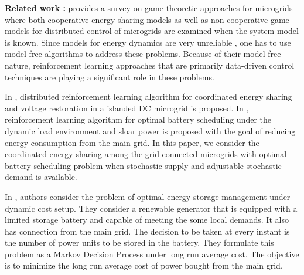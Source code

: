 \textbf{Related work :} \cite{saad2012game} provides a survey on game theoretic approaches for microgrids where both cooperative energy sharing models as well as non-cooperative game models for distributed control of microgrids are examined when the system model is known. Since  models for energy dynamics are very unreliable \cite{zamora2010controls}, one has to use model-free algorithms to address these problems.  Because of their model-free nature, reinforcement learning \cite{sutton1998reinforcement} approaches that are primarily data-driven control techniques are playing a significant role in these problems.

In \cite{zifadistributed}, distributed reinforcement learning algorithm for coordinated energy sharing and voltage restoration in a islanded DC microgrid is proposed. In \cite{leo2014reinforcement}, reinforcement learning algorithm for optimal battery scheduling under the dynamic load environment and sloar power is proposed with the goal of  reducing  energy consumption from the main grid. In this paper, we  consider the coordinated energy sharing among the grid connected microgrids with optimal battery scheduling problem when stochastic supply and adjustable stochastic demand is available.

In \cite{pharsha}, authors consider the problem of optimal energy storage management under dynamic cost setup. They consider a renewable generator that is equipped with a limited storage battery and capable of meeting the some local demands. It also has connection from the main grid. The decision to be taken at every instant is the number of power units to be stored in the battery. They formulate this problem as a Markov Decision Process under long run average cost. The objective is to minimize the long run average cost of power bought from the main grid.


 







%

